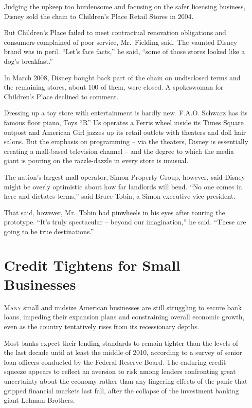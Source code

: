 ﻿\documentclass[12pt]{article}
\begin{document}
Judging the upkeep too burdensome and focusing on the safer licensing business, Disney sold the
chain to Children's Place Retail Stores in 2004.

But Children's Place failed to meet contractual renovation obligations and consumers complained of
poor service, Mr.~Fielding said. The vaunted Disney brand was in peril. ``Let's face facts,'' he
said, ``some of those stores looked like a dog's breakfast.''

In March 2008, Disney bought back part of the chain on undisclosed terms and the remaining stores,
about 100 of them, were closed. A spokeswoman for Children's Place declined to comment.

Dressing up a toy store with entertainment is hardly new. F.A.O. Schwarz has its famous floor piano,
Toys ``R'' Us operates a Ferris wheel inside its Times Square outpost and American Girl jazzes up
its retail outlets with theaters and doll hair salons. But the emphasis on programming -- via the
theaters, Disney is essentially creating a mall-based television channel -- and the degree to which
the media giant is pouring on the razzle-dazzle in every store is unusual.

The nation's largest mall operator, Simon Property Group, however, said Disney might be overly
optimistic about how far landlords will bend. ``No one comes in here and dictates terms,'' said
Bruce Tobin, a Simon executive vice president.

That said, however, Mr.~Tobin had pinwheels in his eyes after touring the prototype. ``It's truly
spectacular -- beyond our imagination,'' he said. ``These are going to be true destinations.''

\section{Credit Tightens for Small Businesses }

\lettrine{M}{any} small and midsize American businesses are still struggling
to secure bank loans, impeding their expansion plans and constraining overall economic growth, even
as the country tentatively rises from its recessionary depths.

Most banks expect their lending standards to remain tighter than the levels of the last decade until
at least the middle of 2010, according to a survey of senior loan officers conducted by the Federal
Reserve Board. The enduring credit squeeze appears to reflect an aversion\cite{aversion} to risk
among lenders confronting great uncertainty about the economy rather than any lingering effects of
the panic that gripped financial markets last fall, after the collapse of the investment banking
giant Lehman Brothers.
\end{document}
